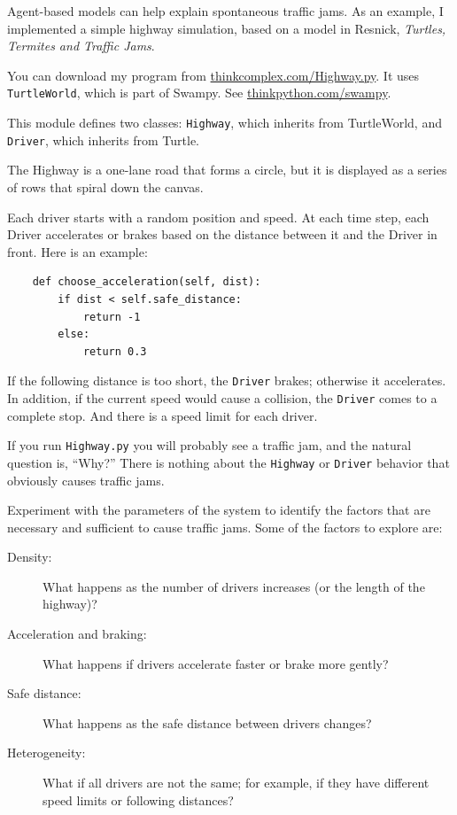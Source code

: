 \documentclass[10pt]{book}
\begin{document}
Agent-based models can help explain spontaneous traffic jams.
As an example, I implemented a simple highway simulation, based on
a model in Resnick, {\em Turtles, Termites and Traffic Jams}.

You can download my program from \url{thinkcomplex.com/Highway.py}.
It uses {\tt TurtleWorld}, which is part of Swampy.
See \url{thinkpython.com/swampy}.

This module defines two classes: {\tt Highway}, which inherits from
TurtleWorld, and {\tt Driver}, which inherits from Turtle.

The Highway is a one-lane road that forms a circle, but it is displayed
as a series of rows that spiral down the canvas.

Each driver starts with a random position and speed.  At each time
step, each Driver accelerates or brakes based on the distance between
it and the Driver in front.  Here is an example:

\begin{verbatim}
    def choose_acceleration(self, dist):
        if dist < self.safe_distance:
            return -1
        else:
            return 0.3
\end{verbatim}

If the following distance is too short, the {\tt Driver} brakes;
otherwise it accelerates.  In addition, if the current speed would
cause a collision, the {\tt Driver} comes to a complete stop.
And there is a speed limit for each driver.

If you run {\tt Highway.py} you will probably see a traffic jam,
and the natural question is, ``Why?''  There is nothing about the
{\tt Highway} or {\tt Driver} behavior that obviously causes
traffic jams.

\begin{exercise}

Experiment with the parameters of the system to identify the factors
that are necessary and sufficient to cause traffic jams.  Some of
the factors to explore are:

\begin{description}

\item[Density:] What happens as the number of drivers increases (or
the length of the highway)?

\item[Acceleration and braking:]  What happens if drivers accelerate
faster or brake more gently?

\item[Safe distance:] What happens as the safe distance between drivers
changes?

\item[Heterogeneity:] What if all drivers are not the same; for
example, if they have different speed limits or following distances?

\end{description}

\end{exercise}
\end{document}
